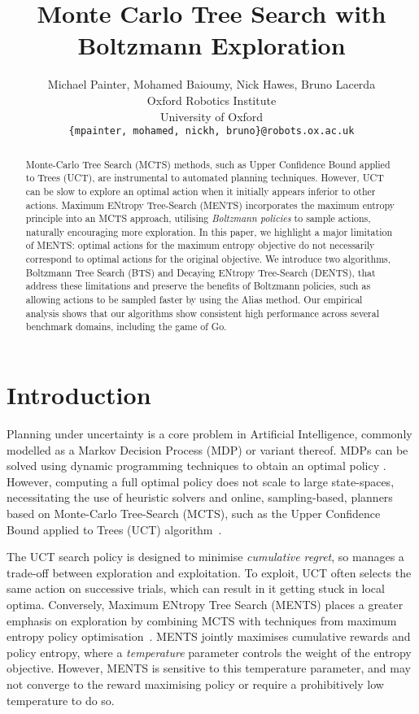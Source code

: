 \documentclass{article}
\title{Monte Carlo Tree Search with Boltzmann Exploration}
\author{%
	Michael Painter, Mohamed Baioumy, Nick Hawes, Bruno Lacerda \\
	Oxford Robotics Institute \\
	University of Oxford \\
	\texttt{\{mpainter, mohamed, nickh, bruno\}@robots.ox.ac.uk} \\
}
\theoremstyle{plain}
\begin{document}
\maketitle





\begin{abstract}
    Monte-Carlo Tree Search (MCTS) methods, such as Upper Confidence Bound applied to Trees (UCT), are instrumental to automated planning techniques. However, UCT can be slow to explore an optimal action when it initially appears inferior to other actions. Maximum ENtropy Tree-Search (MENTS) incorporates the maximum entropy principle into an MCTS approach, utilising \textit{Boltzmann policies} to sample actions, naturally encouraging more exploration. In this paper, we highlight a major limitation of MENTS: optimal actions for the maximum entropy objective do not necessarily correspond to optimal actions for the original objective. We introduce two algorithms, Boltzmann Tree Search (BTS) and Decaying ENtropy Tree-Search (DENTS), that address these limitations and preserve the benefits of Boltzmann policies, such as allowing actions to be sampled faster by using the Alias method. Our empirical analysis shows that our algorithms show consistent high performance across several benchmark domains, including the game of Go. 
\end{abstract}





\section{Introduction} \label{sec:intro}
	Planning under uncertainty is a core problem in Artificial Intelligence, commonly modelled as a Markov Decision Process (MDP) or variant thereof. MDPs can be solved using dynamic programming techniques to obtain an optimal policy \cite{bellman1957markovian}. However, computing a full optimal policy does not scale to large state-spaces, necessitating the use of %
    heuristic solvers \cite{hansen2001lao, bonet2003labeled} and online, sampling-based, planners based on  Monte-Carlo Tree-Search (MCTS), such as the  Upper Confidence Bound applied to Trees (UCT) algorithm~\cite{kocsis2006uct}.
    
	The UCT search policy is designed to minimise \textit{cumulative regret}, so manages a trade-off between exploration and exploitation. To exploit, UCT often selects the same action on successive trials, which can result in it getting stuck in local optima. Conversely, Maximum ENtropy Tree Search (MENTS) places a greater emphasis on exploration by combining MCTS with techniques from maximum entropy policy optimisation~\cite{ziebart2008maximum, haarnoja2017reinforcement, haarnoja2018soft}. MENTS jointly maximises cumulative rewards and policy entropy, where a \textit{temperature} parameter controls the weight of the entropy objective. However, MENTS is sensitive to this temperature parameter, and may not converge to the reward maximising policy or require a prohibitively low temperature to do so.
    
\end{document}
